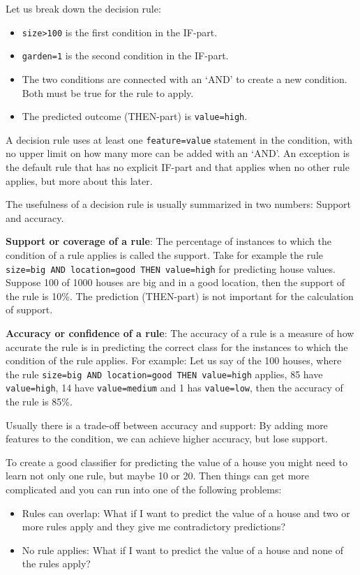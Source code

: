 \documentclass[12pt,]{krantz}
\providecommand{\tightlist}{%
  \setlength{\itemsep}{0pt}\setlength{\parskip}{0pt}}
\begin{document}
Let us break down the decision rule:

\begin{itemize}
\tightlist
\item
  \texttt{size\textgreater{}100} is the first condition in the IF-part.
\item
  \texttt{garden=1} is the second condition in the IF-part.
\item
  The two conditions are connected with an `AND' to create a new
  condition. Both must be true for the rule to apply.
\item
  The predicted outcome (THEN-part) is \texttt{value=high}.
\end{itemize}

A decision rule uses at least one \texttt{feature=value} statement in
the condition, with no upper limit on how many more can be added with an
`AND'. An exception is the default rule that has no explicit IF-part and
that applies when no other rule applies, but more about this later.

The usefulness of a decision rule is usually summarized in two numbers:
Support and accuracy.

\textbf{Support or coverage of a rule}: The percentage of instances to
which the condition of a rule applies is called the support. Take for
example the rule \texttt{size=big\ AND\ location=good\ THEN\ value=high}
for predicting house values. Suppose 100 of 1000 houses are big and in a
good location, then the support of the rule is 10\%. The prediction
(THEN-part) is not important for the calculation of support.

\textbf{Accuracy or confidence of a rule}: The accuracy of a rule is a
measure of how accurate the rule is in predicting the correct class for
the instances to which the condition of the rule applies. For example:
Let us say of the 100 houses, where the rule
\texttt{size=big\ AND\ location=good\ THEN\ value=high} applies, 85 have
\texttt{value=high}, 14 have \texttt{value=medium} and 1 has
\texttt{value=low}, then the accuracy of the rule is 85\%.

Usually there is a trade-off between accuracy and support: By adding
more features to the condition, we can achieve higher accuracy, but lose
support.

To create a good classifier for predicting the value of a house you
might need to learn not only one rule, but maybe 10 or 20. Then things
can get more complicated and you can run into one of the following
problems:

\begin{itemize}
\tightlist
\item
  Rules can overlap: What if I want to predict the value of a house and
  two or more rules apply and they give me contradictory predictions?
\item
  No rule applies: What if I want to predict the value of a house and
  none of the rules apply?
\end{itemize}
\end{document}
